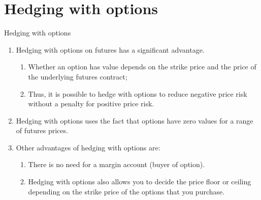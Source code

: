 \documentclass[table,xcolor=pdftex,dvipsnames, handout]{beamer}\usepackage[]{graphicx}\usepackage[]{color}
\begin{document}
\section{Hedging with options}

\begin{frame}{Hedging with options}
\begin{enumerate}[label=\textbullet]
  \item Hedging with options on futures has a significant advantage.
      \begin{enumerate}[label=-]
            \item Whether an option has value depends on the strike price and the price of the underlying futures contract;
            \item Thus, it is possible to hedge with options to reduce negative price risk without a penalty for positive price risk.
      \end{enumerate}
  \item Hedging with options uses the fact that options have zero values for a range of futures prices.
  \item Other advantages of hedging with options are:
      \begin{enumerate}[label=-]
            \item There is no need for a margin account (buyer of option).
            \item Hedging with options also allows you to decide the price floor or ceiling depending on the strike price of the options that you purchase.
      \end{enumerate}
\end{enumerate}
\end{frame}

\end{document}
